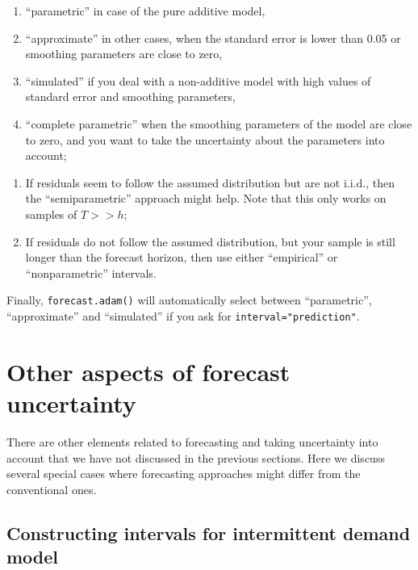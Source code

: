 \documentclass[]{book}
\providecommand{\tightlist}{%
  \setlength{\itemsep}{0pt}\setlength{\parskip}{0pt}}
\theoremstyle{definition}
\theoremstyle{definition}
\theoremstyle{definition}
\theoremstyle{definition}
\theoremstyle{remark}
\begin{document}
\begin{enumerate}
\def\labelenumi{\alph{enumi}.}
\tightlist
\item
  ``parametric'' in case of the pure additive model,
\item
  ``approximate'' in other cases, when the standard error is lower than 0.05 or smoothing parameters are close to zero,
\item
  ``simulated'' if you deal with a non-additive model with high values of standard error and smoothing parameters,
\item
  ``complete parametric'' when the smoothing parameters of the model are close to zero, and you want to take the uncertainty about the parameters into account;
\end{enumerate}

\begin{enumerate}
\def\labelenumi{\arabic{enumi}.}
\setcounter{enumi}{1}
\tightlist
\item
  If residuals seem to follow the assumed distribution but are not i.i.d., then the ``semiparametric'' approach might help. Note that this only works on samples of \(T>>h\);
\item
  If residuals do not follow the assumed distribution, but your sample is still longer than the forecast horizon, then use either ``empirical'' or ``nonparametric'' intervals.
\end{enumerate}

Finally, \texttt{forecast.adam()} will automatically select between ``parametric'', ``approximate'' and ``simulated'' if you ask for \texttt{interval="prediction"}.

\hypertarget{forecastingADAMOther}{%
\section{Other aspects of forecast uncertainty}\label{forecastingADAMOther}}

There are other elements related to forecasting and taking uncertainty into account that we have not discussed in the previous sections. Here we discuss several special cases where forecasting approaches might differ from the conventional ones.

\hypertarget{constructing-intervals-for-intermittent-demand-model}{%
\subsection{Constructing intervals for intermittent demand model}\label{constructing-intervals-for-intermittent-demand-model}}
\end{document}
